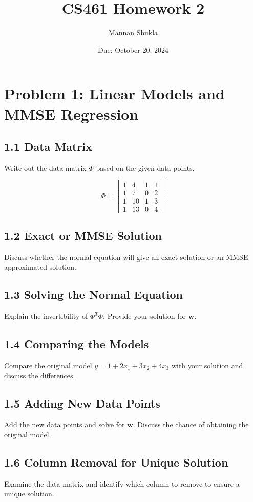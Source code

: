 \documentclass[12pt]{article}
\title{CS461 Homework 2}
\author{Mannan Shukla}
\date{Due: October 20, 2024}
\begin{document}
\maketitle

\section*{Problem 1: Linear Models and MMSE Regression}

\subsection*{1.1 Data Matrix}
Write out the data matrix \( \Phi \) based on the given data points.

\[
\Phi = \begin{bmatrix}
1 & 4 & 1 & 1 \\
1 & 7 & 0 & 2 \\
1 & 10 & 1 & 3 \\
1 & 13 & 0 & 4
\end{bmatrix}
\]

\subsection*{1.2 Exact or MMSE Solution}
Discuss whether the normal equation will give an exact solution or an MMSE approximated solution.

\subsection*{1.3 Solving the Normal Equation}
Explain the invertibility of \( \Phi^T \Phi \). Provide your solution for \( \mathbf{w} \).

\subsection*{1.4 Comparing the Models}
Compare the original model \( y = 1 + 2x_1 + 3x_2 + 4x_3 \) with your solution and discuss the differences.

\subsection*{1.5 Adding New Data Points}
Add the new data points and solve for \( \mathbf{w} \). Discuss the chance of obtaining the original model.

\subsection*{1.6 Column Removal for Unique Solution}
Examine the data matrix and identify which column to remove to ensure a unique solution.
\end{document}

